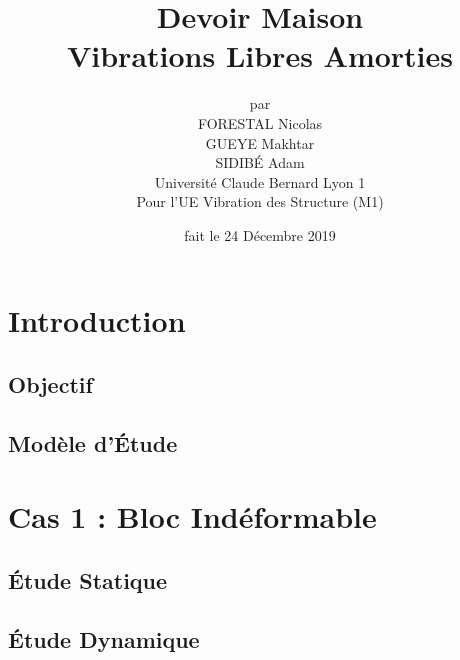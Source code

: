 \documentclass[a4paper,10pt]{report}
\title{Devoir Maison\\ Vibrations Libres Amorties} %
\author{par\\ FORESTAL Nicolas \\ GUEYE Makhtar \\ SIDIBÉ Adam \\ Université Claude Bernard Lyon 1 \\Pour l'UE Vibration des Structure (M1)} %
\date{fait le 24 Décembre 2019} %
\begin{document}
\maketitle %
\tableofcontents %
\listoffigures %
\newpage


\section{Introduction}
\label{sec : Intro}




\subsection{Objectif}
\label{sub : Obj}




\subsection{Modèle d'Étude}
\label{sub : MdE}




\section{Cas 1 : Bloc Indéformable}
\label{sec : Indef}




\subsection{Étude Statique}
\label{sub : Stat}




\subsection{Étude Dynamique}
\label{sub : Dyn}
\end{document}
